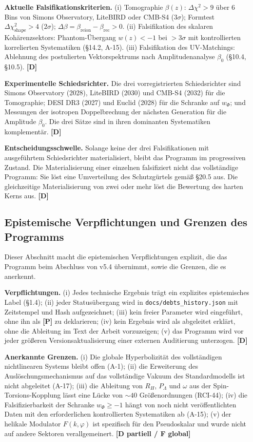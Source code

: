 ﻿\documentclass[11pt,letterpaper]{article}
\begin{document}
\textbf{Aktuelle Falsifikationskriterien.} (i) Tomographie $\beta(z)$: $\Delta \chi^2 > 9$ über 6 Bins von Simons Observatory, LiteBIRD oder CMB-S4 ($3\sigma$); Formtest $\Delta \chi^2_{\text{shape}} > 4$ ($2\sigma$); $\Delta\beta = \beta_{\text{reion}} - \beta_{\text{rec}} > 0$. (ii) Falsifikation des skalaren Kohärenzsektors: Phantom-Übergang $w(z) < -1$ bei $> 3\sigma$ mit kontrollierten korrelierten Systematiken (§14.2, A-15). (iii) Falsifikation des UV-Matchings: Ablehnung des postulierten Vektorspektrums nach Amplitudenanalyse $\beta_0$ (§10.4, §10.5). \textbf{[D]}

\textbf{Experimentelle Schiedsrichter.} Die drei vorregistrierten Schiedsrichter sind Simons Observatory (2028), LiteBIRD (2030) und CMB-S4 (2032) für die Tomographie; DESI DR3 (2027) und Euclid (2028) für die Schranke auf $w_\Phi$; und Messungen der isotropen Doppelbrechung der nächsten Generation für die Amplitude $\beta_0$. Die drei Sätze sind in ihren dominanten Systematiken komplementär. \textbf{[D]}

\textbf{Entscheidungsschwelle.} Solange keine der drei Falsifikationen mit ausgeführtem Schiedsrichter materialisiert, bleibt das Programm im progressiven Zustand. Die Materialisierung einer einzelnen falsifiziert nicht das vollständige Programm: Sie löst eine Umverteilung des Schutzgürtels gemäß §20.5 aus. Die gleichzeitige Materialisierung von zwei oder mehr löst die Bewertung des harten Kerns aus. \textbf{[D]}
\subsection{Epistemische Verpflichtungen und Grenzen des Programms}
Dieser Abschnitt macht die epistemischen Verpflichtungen explizit, die das Programm beim Abschluss von v5.4 übernimmt, sowie die Grenzen, die es anerkennt.

\textbf{Verpflichtungen.} (i) Jedes technische Ergebnis trägt ein explizites epistemisches Label (§1.4); (ii) jeder Statusübergang wird in \texttt{docs/debts\_history.json} mit Zeitstempel und Hash aufgezeichnet; (iii) kein freier Parameter wird eingeführt, ohne ihn als \textbf{[P]} zu deklarieren; (iv) kein Ergebnis wird als abgeleitet erklärt, ohne die Ableitung im Text der Arbeit vorzuzeigen; (v) das Programm wird vor jeder größeren Versionsaktualisierung einer externen Auditierung unterzogen. \textbf{[D]}

\textbf{Anerkannte Grenzen.} (i) Die globale Hyperbolizität des vollständigen nichtlinearen Systems bleibt offen (A-1); (ii) die Erweiterung des Auslöschungsmechanismus auf das vollständige Vakuum des Standardmodells ist nicht abgeleitet (A-17); (iii) die Ableitung von $R_H$, $P_\Lambda$ und $\omega$ aus der Spin-Torsions-Kopplung lässt eine Lücke von $\sim 40$ Größenordnungen (RCI-44); (iv) die Falsifizierbarkeit der Schranke $w_\Phi \geq -1$ hängt von noch nicht veröffentlichten Daten mit den erforderlichen kontrollierten Systematiken ab (A-15); (v) der helikale Modulator $F(k, \varphi)$ ist spezifisch für den Pseudoskalar und wurde nicht auf andere Sektoren verallgemeinert. \textbf{[D partiell / F global]}
\end{document}
